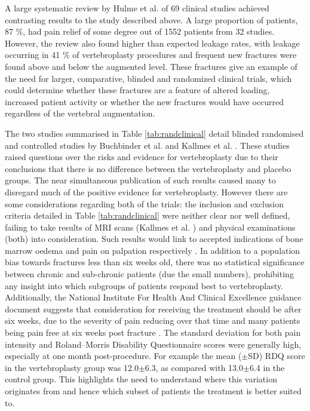 A large systematic review by Hulme et al. \cite{Hulme2006} of 69 clinical
studies achieved contrasting results to the study described above. A
large proportion of patients, 87 \%, had pain relief of some degree out
of 1552 patients from 32 studies. However, the review also found higher
than expected leakage rates, with leakage occurring in 41 \% of
vertebroplasty procedures and frequent new fractures were found above
and below the augmented level. These fractures give an example of the
need for larger, comparative, blinded and randomized clinical trials,
which could determine whether these fractures are a feature of altered
loading, increased patient activity or whether the new fractures would
have occurred regardless of the vertebral augmentation.

The two studies summarised in Table \ref{tab:randclinical} detail blinded
randomised and
controlled studies by Buchbinder et al. \cite{Buchbinder2009} and Kallmes et
al.
\cite{Kallmes2009}. These studies raised questions over the risks and evidence
for
vertebroplasty due to their conclusions that there is no difference
between the vertebroplasty and placebo groups. The near simultaneous
publication of such results caused many to disregard much of the
positive evidence \cite{Muijs2011} for vertebroplasty. However there are some
considerations regarding both of the trials: the inclusion and exclusion
criteria detailed in Table \ref{tab:randclinical} were neither clear nor well
defined,
failing to take results of MRI scans (Kallmes et al. \cite{Kallmes2009}) and
physical examinations (both) into consideration. Such results would link
to accepted indications of bone marrow oedema and pain on palpation
respectively \cite{Jay2013}. In addition to a population bias towards
fractures less than six weeks old, there was no statistical significance
between chronic and sub-chronic patients (due the small numbers),
prohibiting any insight into which subgroups of patients respond best to
vertebroplasty. Additionally, the National Institute For Health And Clinical Excellence guidance document suggests that consideration for receiving the treatment should be after six weeks, due to the severity of pain reducing over that time and many patients being pain free at six weeks post fracture \cite{Nice2013}. The standard deviation for both pain intensity and
Roland--Morris Disability Questionnaire scores were generally high,
especially at one month post-procedure. For example the mean ($\pm$SD) RDQ score in the vertebroplasty group was 12.0$\pm$6.3, as compared with 13.0$\pm$6.4 in the control group. This highlights the need to
understand where this variation originates from and hence which subset
of patients the treatment is better suited to.

